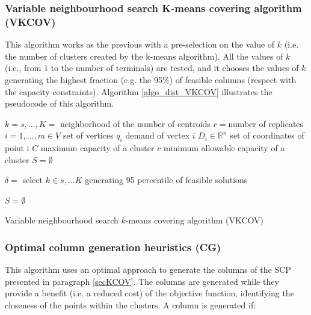 \subsubsection{Variable neighbourhood search K-means covering algorithm (VKCOV)}

This algorithm works as the previous with a pre-selection on the value of $k$ (i.e. the number of clusters created by the k-means algorithm). All the values of $k$ (i.e., from 1 to the number of terminals) are tested, and it chooses the values of $k$ generating the highest fraction (e.g. the 95\%) of feasible columns (respect with the capacity constraints). Algorithm \ref{algo_dist_VKCOV} illustrates the pseudocode of this algorithm.

\begin{algorithm}[H]
\DontPrintSemicolon
\SetAlgoLined

$k=s,...,K =$ neighborhood of the number of centroids \;
$r=$number of replicates\;
$i=1,...,m \in V$ set of vertices \;
$q_i$ demand of vertex $i$ \;
$D_i \in \mathbb{R}^n $ set of coordinates of point i \;
$C$ maximum capacity of a cluster \;
$c$ minimum allowable capacity of a cluster \;
$S= \emptyset $ \;

$\delta = $ select $k \in s,...K$ generating 95 percentile of feasible solutions\;
 
$S= \emptyset $ \;

\caption{Variable neighbourhood search $k$-means covering algorithm (VKCOV)}
\label{algo_dist_VKCOV}    

\end{algorithm}

\subsubsection{Optimal column generation heuristics (CG)}
This algorithm uses an optimal approach to generate the columns of the SCP presented in paragraph \ref{secKCOV}. The columns are generated while they provide a benefit (i.e. a reduced cost) of the objective function, identifying the closeness of the points within the clusters. A column is generated if:

